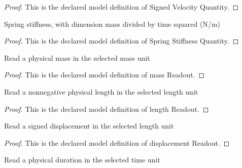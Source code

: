 \begin{proof}
  This is the declared model definition of Signed Velocity Quantity.
\end{proof}
\begin{definition}
  \label{def:physics:phyx-mini-0261:phyxminiproblems-problemphyxmini0261-springstiffnessquantity}
  Spring stiffness, with dimension mass divided by time squared (N/m)
\end{definition}
\begin{proof}
  This is the declared model definition of Spring Stiffness Quantity.
\end{proof}
\begin{definition}
  \label{def:physics:phyx-mini-0261:phyxminiproblems-problemphyxmini0261-massreadout}
  Read a physical mass in the selected mass unit
\end{definition}
\begin{proof}
  This is the declared model definition of mass Readout.
\end{proof}
\begin{definition}
  \label{def:physics:phyx-mini-0261:phyxminiproblems-problemphyxmini0261-lengthreadout}
  Read a nonnegative physical length in the selected length unit
\end{definition}
\begin{proof}
  This is the declared model definition of length Readout.
\end{proof}
\begin{definition}
  \label{def:physics:phyx-mini-0261:phyxminiproblems-problemphyxmini0261-displacementreadout}
  Read a signed displacement in the selected length unit
\end{definition}
\begin{proof}
  This is the declared model definition of displacement Readout.
\end{proof}
\begin{definition}
  \label{def:physics:phyx-mini-0261:phyxminiproblems-problemphyxmini0261-durationreadout}
  Read a physical duration in the selected time unit
\end{definition}
